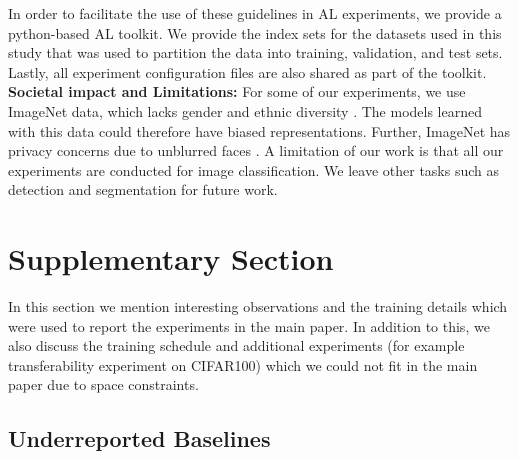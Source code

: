 \documentclass[10pt,twocolumn,letterpaper]{article}
\begin{document}
\noindent In order to facilitate the use of these guidelines in AL experiments, we provide a python-based AL toolkit. We provide the index sets for the datasets used in this study that was used to partition the data into training, validation, and test sets. Lastly, all experiment configuration files are also shared as part of the toolkit.  \\   

\noindent \textbf{Societal impact and Limitations:} For some of our experiments, we use ImageNet data, which lacks gender and ethnic diversity \cite{yang2019fairer}. The models learned with this data could therefore have biased representations. Further, ImageNet has privacy concerns due to unblurred faces \cite{yang2021study}. A limitation of our work is that all our experiments are conducted for image classification. We leave other tasks such as detection and segmentation for future work.



{\small


}






\newpage
\onecolumn
\setcounter{section}{0}
\setcounter{table}{0}
\section{Supplementary Section}
In this section we mention interesting observations and the training details which were used to report the experiments in the main paper. In addition to this, we also 
discuss the training schedule and additional experiments (for example transferability experiment on CIFAR100) which we could not fit in the main paper due to space constraints.

\subsection{Underreported Baselines}
\end{document}
